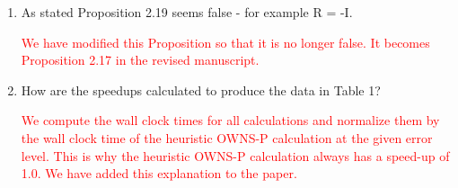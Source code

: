 \documentclass{article}
\newcommand{\response}[1]{\textcolor{red}{#1}}
\begin{document}
\begin{enumerate}
    \item As stated Proposition 2.19 seems false - for example R = -I.

    \response{We have modified this Proposition so that it is no longer false. It becomes Proposition 2.17 in the revised manuscript.}

    
    \item How are the speedups calculated to produce the data in Table 1?

    \response{We compute the wall clock times for all calculations and normalize them by the wall clock time of the heuristic OWNS-P calculation at the given error level. This is why the heuristic OWNS-P calculation always has a speed-up of 1.0. We have added this explanation to the paper.}
    
\end{enumerate}
\end{document}
